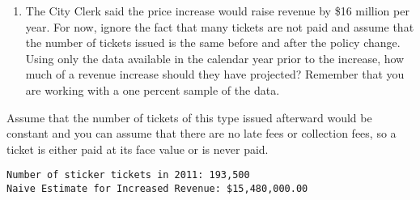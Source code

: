 \documentclass[
  letterpaper,
  DIV=11,
  numbers=noendperiod]{scrartcl}
\newenvironment{Shaded}{\begin{snugshade}}{\end{snugshade}}
\newcommand{\BuiltInTok}[1]{\textcolor[rgb]{0.00,0.23,0.31}{#1}}
\newcommand{\CommentTok}[1]{\textcolor[rgb]{0.37,0.37,0.37}{#1}}
\newcommand{\DecValTok}[1]{\textcolor[rgb]{0.68,0.00,0.00}{#1}}
\newcommand{\NormalTok}[1]{\textcolor[rgb]{0.00,0.23,0.31}{#1}}
\newcommand{\OperatorTok}[1]{\textcolor[rgb]{0.37,0.37,0.37}{#1}}
\newcommand{\SpecialCharTok}[1]{\textcolor[rgb]{0.37,0.37,0.37}{#1}}
\newcommand{\SpecialStringTok}[1]{\textcolor[rgb]{0.13,0.47,0.30}{#1}}
\newcommand{\StringTok}[1]{\textcolor[rgb]{0.13,0.47,0.30}{#1}}
\providecommand{\tightlist}{%
  \setlength{\itemsep}{0pt}\setlength{\parskip}{0pt}}\usepackage{longtable,booktabs,array}
\begin{document}
\begin{enumerate}
\def\labelenumi{\arabic{enumi}.}
\setcounter{enumi}{2}
\tightlist
\item
  The City Clerk said the price increase would raise revenue by \$16
  million per year. For now, ignore the fact that many tickets are not
  paid and assume that the number of tickets issued is the same before
  and after the policy change. Using only the data available in the
  calendar year prior to the increase, how much of a revenue increase
  should they have projected? Remember that you are working with a one
  percent sample of the data.
\end{enumerate}

Assume that the number of tickets of this type issued afterward would be
constant and you can assume that there are no late fees or collection
fees, so a ticket is either paid at its face value or is never paid.

\begin{Shaded}
\end{Shaded}

\begin{verbatim}
Number of sticker tickets in 2011: 193,500
Naive Estimate for Increased Revenue: $15,480,000.00
\end{verbatim}
\end{document}
